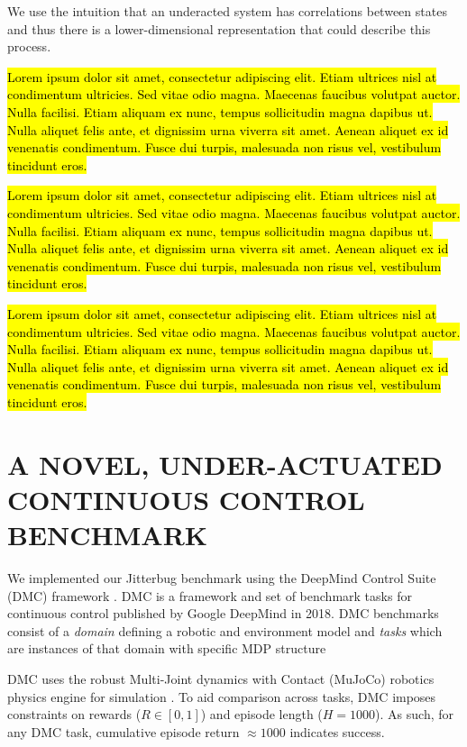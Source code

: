\documentclass[letterpaper, 10 pt, conference]{ieeeconf}
\begin{document}
We use the intuition that an underacted system has correlations between states %
and thus there is a lower-dimensional representation that could describe this process. 

\hl{Lorem ipsum dolor sit amet, consectetur adipiscing elit. Etiam ultrices nisl at condimentum ultricies. Sed vitae odio magna. Maecenas faucibus volutpat auctor. Nulla facilisi. Etiam aliquam ex nunc, tempus sollicitudin magna dapibus ut. Nulla aliquet felis ante, et dignissim urna viverra sit amet. Aenean aliquet ex id venenatis condimentum. Fusce dui turpis, malesuada non risus vel, vestibulum tincidunt eros.}

\hl{Lorem ipsum dolor sit amet, consectetur adipiscing elit. Etiam ultrices nisl at condimentum ultricies. Sed vitae odio magna. Maecenas faucibus volutpat auctor. Nulla facilisi. Etiam aliquam ex nunc, tempus sollicitudin magna dapibus ut. Nulla aliquet felis ante, et dignissim urna viverra sit amet. Aenean aliquet ex id venenatis condimentum. Fusce dui turpis, malesuada non risus vel, vestibulum tincidunt eros.}

\hl{Lorem ipsum dolor sit amet, consectetur adipiscing elit. Etiam ultrices nisl at condimentum ultricies. Sed vitae odio magna. Maecenas faucibus volutpat auctor. Nulla facilisi. Etiam aliquam ex nunc, tempus sollicitudin magna dapibus ut. Nulla aliquet felis ante, et dignissim urna viverra sit amet. Aenean aliquet ex id venenatis condimentum. Fusce dui turpis, malesuada non risus vel, vestibulum tincidunt eros.}

\section{A NOVEL, UNDER-ACTUATED CONTINUOUS CONTROL BENCHMARK}

We implemented our Jitterbug benchmark using the DeepMind Control Suite (DMC) framework \cite{Tassa2018DMC}.
DMC is a framework and set of benchmark tasks for continuous control published by Google DeepMind in 2018.
DMC benchmarks consist of a \emph{domain} defining a robotic and environment model and \emph{tasks} which are instances of that domain with specific MDP structure

DMC uses the robust Multi-Joint dynamics with Contact (MuJoCo) robotics physics engine for simulation \cite{Todorov2012MuJoCo}.
To aid comparison across tasks, DMC imposes constraints on rewards ($R \in [0, 1]$) and episode length ($H = 1000$).
As such, for any DMC task, cumulative episode return $\approx 1000$ indicates success.
\end{document}
